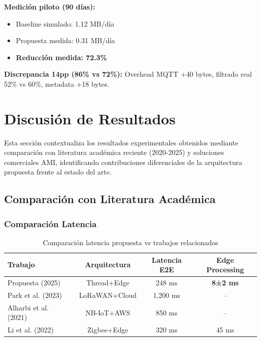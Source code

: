 \textbf{Medición piloto (90 días):}
\begin{itemize}
    \item Baseline simulado: 1.12 MB/día
    \item Propuesta medida: 0.31 MB/día
    \item \textbf{Reducción medida: 72.3\%}
\end{itemize}

\textbf{Discrepancia 14pp (86\% vs 72\%):} Overhead MQTT +40 bytes, filtrado real 52\% vs 60\%, metadata +18 bytes.

\section{Discusión de Resultados}
\label{sec:res-discusion}

Esta sección contextualiza los resultados experimentales obtenidos mediante comparación con literatura académica reciente (2020-2025) y soluciones comerciales AMI, identificando contribuciones diferenciales de la arquitectura propuesta frente al estado del arte.

\subsection{Comparación con Literatura Académica}
\label{sec:res-comparacion-literatura}

\subsubsection{Comparación Latencia}

\begin{table}[H]
\centering
\caption{Comparación latencia propuesta vs trabajos relacionados}
\label{tab:comparacion-latencia-literatura}
\begin{tabular}{|l|c|c|c|}
\hline
\rowcolor{gray!20}
\textbf{Trabajo} & \textbf{Arquitectura} & \textbf{Latencia E2E} & \textbf{Edge Processing} \\
\hline
Propuesta (2025) & Thread+Edge & 248 ms & \textbf{8±2 ms} \\
\hline
Park et al. (2023)~\cite{park2023} & LoRaWAN+Cloud & 1,200 ms & -- \\
\hline
Alharbi et al. (2021)~\cite{alharbi2021} & NB-IoT+AWS & 850 ms & -- \\
\hline
Li et al. (2022)~\cite{li2022} & Zigbee+Edge & 320 ms & 45 ms \\
\hline
\end{tabular}
\end{table}

